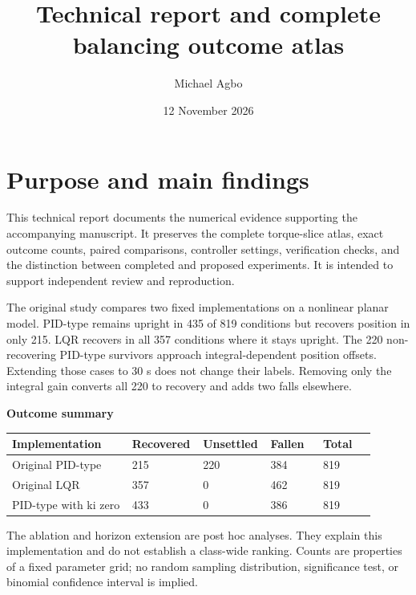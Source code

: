 \documentclass[11pt,a4paper]{article}
\title{Technical report and complete balancing outcome atlas}
\author{Michael Agbo}
\date{12 November 2026}
\begin{document}
\maketitle
\section*{Purpose and main findings}
This technical report documents the numerical evidence supporting the accompanying manuscript. It preserves the complete torque-slice atlas, exact outcome counts, paired comparisons, controller settings, verification checks, and the distinction between completed and proposed experiments. It is intended to support independent review and reproduction.

The original study compares two fixed implementations on a nonlinear planar model. PID-type remains upright in 435 of 819 conditions but recovers position in only 215. LQR recovers in all 357 conditions where it stays upright. The 220 non-recovering PID-type survivors approach integral-dependent position offsets. Extending those cases to 30 s does not change their labels. Removing only the integral gain converts all 220 to recovery and adds two falls elsewhere.

\textbf{Outcome summary}
\begin{longtable}{p{0.324\linewidth}p{0.144\linewidth}p{0.144\linewidth}p{0.144\linewidth}p{0.144\linewidth}}
\toprule
Implementation & Recovered & Unsettled & Fallen & Total \\ \midrule \endhead
Original PID-type & 215 & 220 & 384 & 819 \\
Original LQR & 357 & 0 & 462 & 819 \\
PID-type with ki zero & 433 & 0 & 386 & 819 \\
\bottomrule
\end{longtable}
The ablation and horizon extension are post hoc analyses. They explain this implementation and do not establish a class-wide ranking. Counts are properties of a fixed parameter grid; no random sampling distribution, significance test, or binomial confidence interval is implied.
\end{document}
